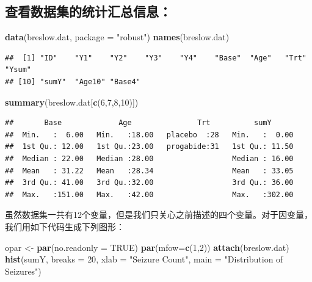 \documentclass[
]{article}
\newenvironment{Shaded}{\begin{snugshade}}{\end{snugshade}}
\newcommand{\DataTypeTok}[1]{\textcolor[rgb]{0.13,0.29,0.53}{#1}}
\newcommand{\DecValTok}[1]{\textcolor[rgb]{0.00,0.00,0.81}{#1}}
\newcommand{\KeywordTok}[1]{\textcolor[rgb]{0.13,0.29,0.53}{\textbf{#1}}}
\newcommand{\NormalTok}[1]{#1}
\newcommand{\OtherTok}[1]{\textcolor[rgb]{0.56,0.35,0.01}{#1}}
\newcommand{\StringTok}[1]{\textcolor[rgb]{0.31,0.60,0.02}{#1}}
\begin{document}
\hypertarget{ux67e5ux770bux6570ux636eux96c6ux7684ux7edfux8ba1ux6c47ux603bux4fe1ux606f}{%
\subsection{查看数据集的统计汇总信息：}\label{ux67e5ux770bux6570ux636eux96c6ux7684ux7edfux8ba1ux6c47ux603bux4fe1ux606f}}

\begin{Shaded}
\begin{Highlighting}[]
\KeywordTok{data}\NormalTok{(breslow.dat, }\DataTypeTok{package =} \StringTok{"robust"}\NormalTok{)}
\KeywordTok{names}\NormalTok{(breslow.dat)}
\end{Highlighting}
\end{Shaded}

\begin{verbatim}
##  [1] "ID"    "Y1"    "Y2"    "Y3"    "Y4"    "Base"  "Age"   "Trt"   "Ysum" 
## [10] "sumY"  "Age10" "Base4"
\end{verbatim}

\begin{Shaded}
\begin{Highlighting}[]
\KeywordTok{summary}\NormalTok{(breslow.dat[}\KeywordTok{c}\NormalTok{(}\DecValTok{6}\NormalTok{,}\DecValTok{7}\NormalTok{,}\DecValTok{8}\NormalTok{,}\DecValTok{10}\NormalTok{)])}
\end{Highlighting}
\end{Shaded}

\begin{verbatim}
##       Base             Age               Trt          sumY       
##  Min.   :  6.00   Min.   :18.00   placebo  :28   Min.   :  0.00  
##  1st Qu.: 12.00   1st Qu.:23.00   progabide:31   1st Qu.: 11.50  
##  Median : 22.00   Median :28.00                  Median : 16.00  
##  Mean   : 31.22   Mean   :28.34                  Mean   : 33.05  
##  3rd Qu.: 41.00   3rd Qu.:32.00                  3rd Qu.: 36.00  
##  Max.   :151.00   Max.   :42.00                  Max.   :302.00
\end{verbatim}

虽然数据集一共有12个变量，但是我们只关心之前描述的四个变量。对于因变量，我们用如下代码生成下列图形：

\begin{Shaded}
\begin{Highlighting}[]
\NormalTok{opar <-}\StringTok{ }\KeywordTok{par}\NormalTok{(}\DataTypeTok{no.readonly =} \OtherTok{TRUE}\NormalTok{)}
\KeywordTok{par}\NormalTok{(}\DataTypeTok{mfow=}\KeywordTok{c}\NormalTok{(}\DecValTok{1}\NormalTok{,}\DecValTok{2}\NormalTok{))}
\KeywordTok{attach}\NormalTok{(breslow.dat)}
\KeywordTok{hist}\NormalTok{(sumY, }\DataTypeTok{breaks =} \DecValTok{20}\NormalTok{, }
       \DataTypeTok{xlab =} \StringTok{"Seizure Count"}\NormalTok{,}
       \DataTypeTok{main =} \StringTok{"Distribution of Seizures"}\NormalTok{)}
\end{Highlighting}
\end{Shaded}
\end{document}
